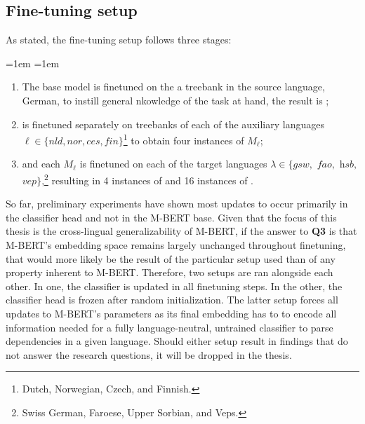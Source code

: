 \subsection{Fine-tuning setup}
\label{sub:training_setup}
	As stated, the fine-tuning setup follows three stages:
	\begin{list}{}{\leftmargin=1em \rightmargin=1em}
		\item
		\begin{enumerate}[label=Stage \arabic*:, leftmargin=*, align=left]
		    \item The base model \mbase is finetuned on the a treebank in the source language, German, to instill general nkowledge of the task at hand, the result is \mde;
		    \item \mde is finetuned separately on treebanks of each of the auxiliary languages $\ell \in \{\textit{nld}, \textit{nor}, \textit{ces}, \textit{fin}\}$\footnote{Dutch, Norwegian, Czech, and Finnish.} to obtain four instances of $M_\ell$;
		    \item \mde and each $M_\ell$ is finetuned on each of the target languages $\lambda \in \{\textit{gsw},$ $\textit{fao},$ $\textit{hsb},$ $\textit{vep}\}$,\footnote{Swiss German, Faroese, Upper Sorbian, and Veps.} resulting in 4 instances of  and 16 instances of \m{\ell}{\lambda}.
		\end{enumerate}
	\end{list}

	So far, preliminary experiments have shown most updates to occur primarily in the classifier head and not in the M-BERT base. Given that the focus of this thesis is the cross-lingual generalizability of M-BERT, if the answer to \textbf{Q3} is that M-BERT's embedding space remains largely unchanged throughout finetuning, that would more likely be the result of the particular setup used than of any property inherent to M-BERT. Therefore, two setups are ran alongside each other. In one, the classifier is updated in all finetuning steps. In the other, the classifier head is frozen after random initialization. The latter setup forces all updates to M-BERT's parameters as its final embedding has to to encode all information needed for a fully language-neutral, untrained classifier to parse dependencies in a given language. Should either setup result in findings that do not answer the research questions, it will be dropped in the thesis.


